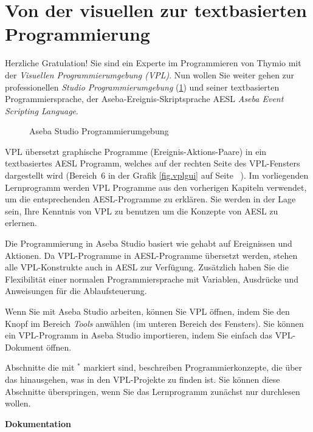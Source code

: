 \part{Von der visuellen zur textbasierten Programmierung}

\label{ch.next}

Herzliche Gratulation! Sie sind ein Experte im Programmieren von Thymio mit der \textit{Visuellen Programmierumgebung (VPL)}. Nun wollen Sie weiter gehen zur professionellen \textit{Studio Programmierumgebung} (\cref{fig.studio}) und seiner textbasierten Programmiersprache, der Aseba-Ereignis-Skriptsprache AESL \textit{Aseba Event Scripting Language}.

\begin{figure} 
	\begin{center}
		\caption{Aseba Studio Programmierumgebung}\label{fig.studio}
	\end{center}
\end{figure}

VPL übersetzt graphische Programme (Ereignis-Aktions-Paare) in ein textbasiertes AESL Programm, welches auf der rechten Seite des VPL-Fensters dargestellt wird (Bereich~6 in der Grafik \cref{fig.vplgui} auf Seite ~\pageref{fig.vplgui}). Im vorliegenden Lernprogramm werden VPL Programme aus den vorherigen Kapiteln verwendet, um die entsprechenden AESL-Programme zu erklären. Sie werden in der Lage sein, Ihre Kenntnis von VPL zu benutzen um die Konzepte von AESL zu erlernen.

Die Programmierung in Aseba Studio basiert wie gehabt auf Ereignissen und Aktionen. Da VPL-Programme in AESL-Programme übersetzt werden, stehen alle VPL-Konstrukte auch in AESL zur Verfügung. Zusätzlich haben Sie die Flexibilität einer normalen Programmiersprache mit Variablen, Ausdrücke und Anweisungen für die Ablaufsteuerung.

Wenn Sie mit Aseba Studio arbeiten, können Sie VPL öffnen, indem Sie den Knopf  im Bereich \emph{Tools} anwählen (im unteren Bereich des Fensters). Sie können ein VPL-Programm in Aseba Studio importieren, indem Sie einfach das VPL-Dokument öffnen.

Abschnitte die mit $^*$ markiert sind, beschreiben Programmierkonzepte, die über das hinausgehen, was in den VPL-Projekte zu finden ist. Sie können diese Abschnitte überspringen, wenn Sie das Lernprogramm zunächst nur durchlesen wollen. 

\textbf{\large Dokumentation}

